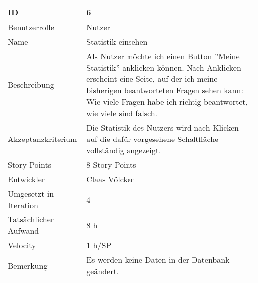 \begin{tabularx}{\textwidth}{|p{}|X|}
	\hline
	ID & 6\\
	\hline
	Benutzerrolle & Nutzer\\
	\hline
	Name & Statistik einsehen\\
	\hline
	Beschreibung & Als Nutzer möchte ich einen Button ''Meine Statistik'' anklicken können. Nach Anklicken erscheint eine Seite, auf der ich meine bisherigen beantworteten Fragen sehen kann: Wie viele Fragen habe ich richtig beantwortet, wie viele sind falsch.\\
	\hline
	Akzeptanzkriterium & Die Statistik des Nutzers wird nach Klicken auf die dafür vorgesehene Schaltfläche vollständig angezeigt.\\
	\hline
	Story Points & 8 Story Points\\
	\hline
	Entwickler & Claas Völcker\\
	\hline
	Umgesetzt in Iteration & 4\\
	\hline
	Tatsächlicher Aufwand & 8 h\\
	\hline
	Velocity & 1 h/SP\\
	\hline
	Bemerkung &  Es werden keine Daten in der Datenbank geändert.\\
	\hline
\end{tabularx}
\vspace{20pt}
